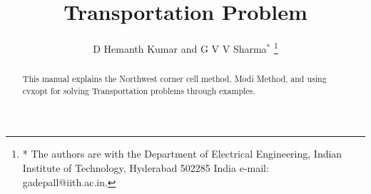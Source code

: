 \documentclass[journal,12pt,twocolumn]{IEEEtran}
\begin{document}
\let\StandardTheFigure\thefigure
\renewcommand{\thefigure}{\theproblem}


\def\putbox#1#2#3{\makebox[0in][l]{\makebox[#1][l]{}\raisebox{\baselineskip}[0in][0in]{\raisebox{#2}[0in][0in]{#3}}}}
     \def\rightbox#1{\makebox[0in][r]{#1}}
     \def\centbox#1{\makebox[0in]{#1}}
     \def\topbox#1{\raisebox{-\baselineskip}[0in][0in]{#1}}
     \def\midbox#1{\raisebox{-0.5\baselineskip}[0in][0in]{#1}}


\title{
Transportation Problem
}
\author{D Hemanth Kumar and G V V Sharma$^{*}$%
\thanks{* The authors are with the Department
of Electrical Engineering, Indian Institute of Technology, Hyderabad
502285 India e-mail:  gadepall@iith.ac.in.}%
}
%
\maketitle
%
\begin{abstract}
This manual explains the Northwest corner cell method, Modi Method, and using cvxopt for solving Transportation problems through examples.
\end{abstract}
%
\end{document}
